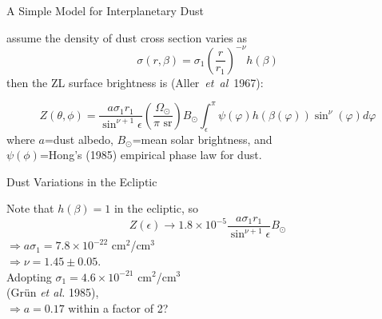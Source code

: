 \documentclass[20pt,35mmSlide,landscape]{foils}
\begin{document}
\vspace*{-1.5in}\parbox{10in}{
\parbox[c]{5.5in}{
\begin{center}
{\normalsize
\vspace*{5ex}A Simple Model for Interplanetary Dust\vspace*{1ex}}
\end{center}
\noindent assume the density of dust cross section varies as
{\normalsize
\begin{displaymath}
\sigma(r,\beta)=\sigma_1\left(\frac{r}{r_1}\right)^{-\nu}h(\beta)
\end{displaymath}
}
\noindent then the ZL surface brightness is
\mbox{(Aller {\it et al} 1967):}
}
\hfil\parbox{4.5in}{
\begin{figure}[t]
\vspace*{-1in}
\end{figure}
}
}
\vspace*{-2.3in}\parbox{10in}{
{\normalsize
\begin{displaymath}
Z(\theta,\phi)=\frac{a\sigma_1 r_1}{\sin^{\nu+1}\epsilon}
\left(\frac{\Omega_\odot}{\pi\mbox{ sr}}\right)B_\odot
\int_\epsilon^\pi\psi(\varphi)h(\beta(\varphi))
\sin^\nu(\varphi)d\varphi
\end{displaymath}
}
where $a$=dust albedo, $B_\odot$=mean solar brightness, and\\
$\psi(\phi)$=Hong's (1985) empirical phase law for dust.
}

\newpage
\pagecolor{light-yellow}
\normalsize

\vspace*{-2in}\parbox{10in}{
\parbox[c]{4.5in}{
\begin{center}
{\normalsize
\vspace*{3ex}Dust Variations in the Ecliptic\vspace*{3ex}}
\end{center}
Note that $h(\beta)=1$ in the ecliptic, so
{\normalsize
\begin{displaymath}
Z(\epsilon)\rightarrow1.8\times10^{-5}
\frac{a\sigma_1 r_1}{\sin^{\nu+1}\epsilon}B_\odot
\end{displaymath}
}
$\Rightarrow a\sigma_1=7.8\times10^{-22}$ cm$^2$/cm$^3$\\
$\Rightarrow \nu=1.45\pm0.05$.\\

Adopting $\sigma_1=4.6\times10^{-21}$ cm$^2$/cm$^3$\\
(Gr\"{u}n {\it et al.} 1985),\\
$\Rightarrow a=0.17$ within a factor of 2?
}
\hfil\parbox{5.0in}{
\begin{figure}[t]
\vspace*{-0.0in}
\end{figure}
}
}
\end{document}
